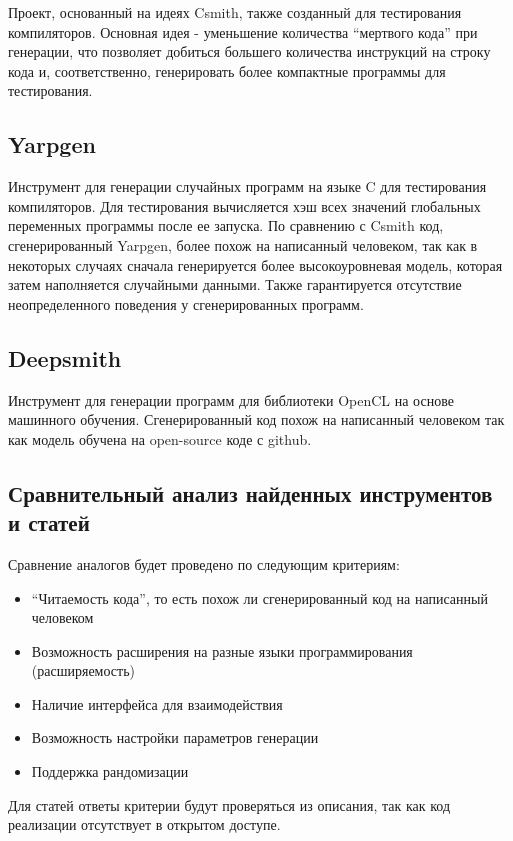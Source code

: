 Проект, основанный на идеях Csmith, также созданный для тестирования компиляторов.
Основная идея - уменьшение количества “мертвого кода” при генерации,
что позволяет добиться большего количества инструкций на строку кода и,
соответственно, генерировать более компактные программы для тестирования. \cite{ldrgen}


\subsection{Yarpgen}

Инструмент для генерации случайных программ на языке C для тестирования компиляторов.
Для тестирования вычисляется хэш всех значений глобальных переменных программы после ее запуска.
По сравнению с Csmith код, сгенерированный Yarpgen, более похож на написанный человеком,
так как в некоторых случаях сначала генерируется более высокоуровневая модель,
которая затем наполняется случайными данными.
Также гарантируется отсутствие неопределенного поведения у сгенерированных программ. \cite{yarpgen}

\subsection{Deepsmith}

Инструмент для генерации программ для библиотеки OpenCL на основе машинного обучения.
Сгенерированный код похож на написанный человеком так как модель обучена на open-source коде с github.
\cite{deepsmith}

\subsection{Сравнительный анализ найденных инструментов и статей}

Сравнение аналогов будет проведено по следующим критериям:
\begin{itemize}
    \item “Читаемость кода”, то есть похож ли сгенерированный код на написанный человеком
    \item Возможность расширения на разные языки программирования (расширяемость)
    \item Наличие интерфейса для взаимодействия
    \item Возможность настройки параметров генерации
    \item Поддержка рандомизации
\end{itemize}

Для статей ответы критерии будут проверяться из описания, так как код реализации отсутствует в открытом доступе.


